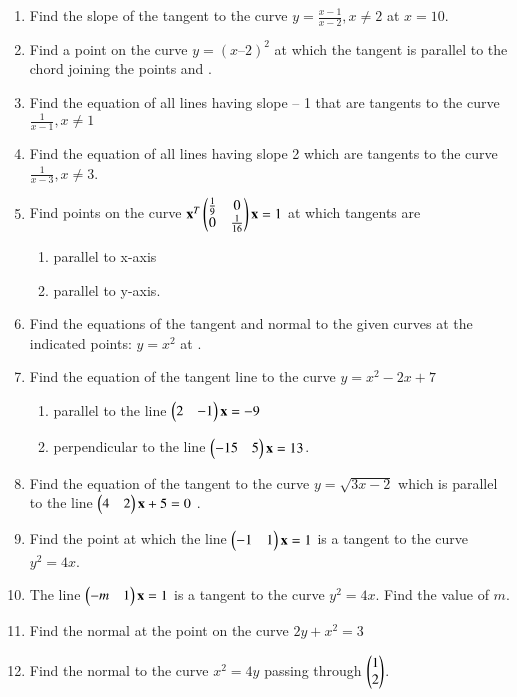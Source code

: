 \begin{enumerate}[label=\thesection.\arabic*.,ref=\thesection.\theenumi]
\item Find the slope of the tangent to the curve $y = \frac{x-1}{x-2}, x\ne 2$ at $x = 10$.
\\
\solution

\item Find a point on the curve $y = (x – 2)^2$ at which the tangent is parallel to the chord joining the points  and .
\item Find the equation of all lines having slope – 1 that are tangents to the curve $\frac{1}
{x -1}, x \ne 1$
\item Find the equation of all lines having slope 2 which are tangents to the curve $\frac{1}
{x - 3} , x \ne 3$.
%
\item Find points on the curve 
$
\mathbf{x}^T\begin{pmatrix}\frac{1}{9} & 0 \\ 0 & \frac{1}{16}\end{pmatrix}\mathbf{x} = 1
$
%
at which tangents are
\begin{enumerate}
\item  parallel to x-axis
\item  parallel to y-axis.
\end{enumerate}
\item Find the equations of the tangent and normal to the given curves at the indicated points:
$
y = x^2
$
at .
\item Find the equation of the tangent line to the curve $y = x^2-2x+7$
\begin{enumerate}
%
\item  parallel to the line $\begin{pmatrix}2 & -1\end{pmatrix}\mathbf{x}= -9$ 
\item  perpendicular to the line $\begin{pmatrix}-15 & 5\end{pmatrix}\mathbf{x} = 13$. 
\end{enumerate}
\item Find the equation of the tangent to the curve $y = \sqrt{3x - 2}$ which is parallel to the line $\begin{pmatrix}4 & 2\end{pmatrix}\mathbf{x}+ 5 =0$ .
\item Find the point at which the line $\begin{pmatrix}-1 & 1\end{pmatrix}\mathbf{x} =  1$ is a tangent to the curve $y^2 = 4x$.
%
\item The line $\begin{pmatrix}-m & 1\end{pmatrix}\mathbf{x} = 1$ is a tangent to the curve $y^2 = 4x$.  Find the value of $m$.
\item  Find the normal at the point  on the curve $2y + x^2 = 3$ 
\item  Find the normal to the curve $x^2=4y$ passing through $\begin{pmatrix}1\\2\end{pmatrix}$.

\end{enumerate}
